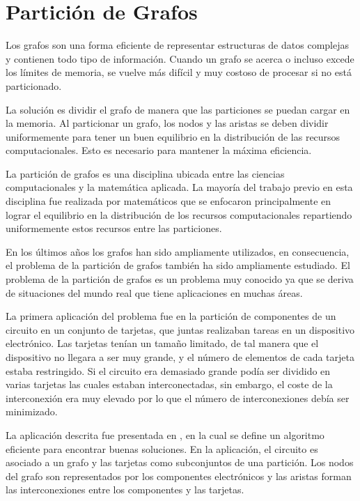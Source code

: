 \section{Partición de Grafos}

Los grafos son una forma eficiente de representar estructuras de datos complejas y contienen todo tipo de información. Cuando un grafo se acerca o incluso excede los límites de memoria, se vuelve más difícil y muy costoso de procesar si no está particionado. 

La solución es dividir el grafo de manera que las particiones se puedan cargar en la memoria. Al particionar un grafo, los nodos y las aristas se deben dividir uniformemente para tener un buen equilibrio en la distribución de las recursos computacionales. Esto es necesario para mantener la máxima eficiencia.

La partición de grafos es una disciplina ubicada entre las ciencias computacionales y la matemática aplicada. La mayoría del trabajo previo en esta disciplina fue realizada por matemáticos que se enfocaron principalmente en lograr el equilibrio en la distribución de los recursos computacionales repartiendo uniformemente estos recursos entre las particiones.

En los últimos años los grafos han sido ampliamente utilizados, en consecuencia, el problema de la partición de grafos también ha sido ampliamente estudiado. El problema de la partición de grafos es un problema muy conocido ya que se deriva de situaciones del mundo real que tiene aplicaciones en muchas áreas. 

La primera aplicación del problema fue en la partición de componentes de un circuito en un conjunto de tarjetas, que juntas realizaban tareas en un dispositivo electrónico. Las tarjetas tenían un tamaño limitado, de tal manera que el dispositivo no llegara a ser muy grande, y el número de elementos de cada tarjeta estaba restringido. Si el circuito era demasiado grande podía ser dividido en varias tarjetas las cuales estaban interconectadas, sin embargo, el coste de la interconexión era muy elevado por lo que el número de interconexiones debía ser minimizado.

La aplicación descrita fue presentada en \cite{KernighanLin}, en la cual se define un algoritmo eficiente para encontrar buenas soluciones. En la aplicación, el circuito es asociado a un grafo y las tarjetas como subconjuntos de una partición. Los nodos del grafo son representados por los componentes electrónicos y las aristas forman las interconexiones entre los componentes y las tarjetas.


